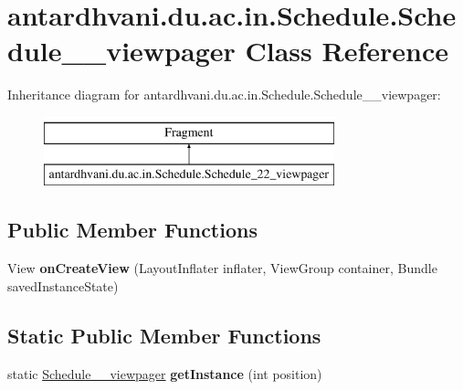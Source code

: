 \hypertarget{classantardhvani_1_1du_1_1ac_1_1in_1_1_schedule_1_1_schedule__22__viewpager}{}\section{antardhvani.\+du.\+ac.\+in.\+Schedule.\+Schedule\+\_\+\_\+viewpager Class Reference}
\label{classantardhvani_1_1du_1_1ac_1_1in_1_1_schedule_1_1_schedule__22__viewpager}
Inheritance diagram for antardhvani.\+du.\+ac.\+in.\+Schedule.\+Schedule\+\_\+\_\+viewpager\+:\begin{figure}[H]
\begin{center}
\leavevmode
\includegraphics[height=2.000000cm]{classantardhvani_1_1du_1_1ac_1_1in_1_1_schedule_1_1_schedule__22__viewpager}
\end{center}
\end{figure}
\subsection*{Public Member Functions}
\begin{DoxyCompactItemize}
\item 
\hypertarget{classantardhvani_1_1du_1_1ac_1_1in_1_1_schedule_1_1_schedule__22__viewpager_ad2113db8db7fad1e96b5f08aee8150c4}{}View {\bfseries on\+Create\+View} (Layout\+Inflater inflater, View\+Group container, Bundle saved\+Instance\+State)\label{classantardhvani_1_1du_1_1ac_1_1in_1_1_schedule_1_1_schedule__22__viewpager_ad2113db8db7fad1e96b5f08aee8150c4}

\end{DoxyCompactItemize}
\subsection*{Static Public Member Functions}
\begin{DoxyCompactItemize}
\item 
\hypertarget{classantardhvani_1_1du_1_1ac_1_1in_1_1_schedule_1_1_schedule__22__viewpager_ae437690beeec2b0b4820527bf13f6fce}{}static \hyperlink{classantardhvani_1_1du_1_1ac_1_1in_1_1_schedule_1_1_schedule__22__viewpager}{Schedule\+\_\+\_\+viewpager} {\bfseries get\+Instance} (int position)\label{classantardhvani_1_1du_1_1ac_1_1in_1_1_schedule_1_1_schedule__22__viewpager_ae437690beeec2b0b4820527bf13f6fce}

\end{DoxyCompactItemize}
